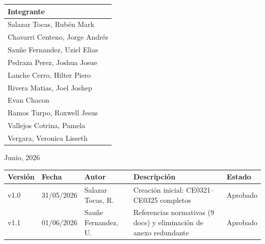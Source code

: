 \documentclass[11pt, a4paper, oneside]{report}
\begin{document}
\begin{titlepage}
  \begin{tabular}{@{}|l|@{}}
    \arrayrulecolor{upeu_dark}
    \rowcolor{upeu_dark}
    {\color{white}\bfseries\small Integrante} \\ \hline
    {\color{body_gray}\small Salazar Tocas, Rubén Mark} \\ \hline
    {\color{body_gray}\small Chavarri Centeno, Jorge Andrés} \\ \hline
    {\color{body_gray}\small Sauñe Fernandez, Uziel Elias} \\ \hline
    {\color{body_gray}\small Pedraza Perez, Joshua Josue} \\ \hline
    {\color{body_gray}\small Lanche Cerro, Hilter Piero} \\ \hline
    {\color{body_gray}\small Rivera Matias, Joel Joshep} \\ \hline
    {\color{body_gray}\small Evan Chacon} \\ \hline
    {\color{body_gray}\small Ramos Turpo, Roxwell Jesus} \\ \hline
    {\color{body_gray}\small Vallejos Cotrina, Pamela} \\ \hline
    {\color{body_gray}\small Vergara, Veronica Lisseth} \\ \hline
  \end{tabular}

  \vspace{0.6cm}
  {\color{body_gray} Junio, 2026}

  \vspace*{\fill}

\end{titlepage}

\newpage

\thispagestyle{empty}
\vspace{2cm}

{\centering

\begin{tabular}{@{}|C{1.5cm}|C{2.2cm}|L{3cm}|L{5cm}|C{2cm}|@{}}


  {\color{white}\bfseries\small Versión} &
  {\color{white}\bfseries\small Fecha} &
  {\color{white}\bfseries\small Autor} &
  {\color{white}\bfseries\small Descripción} &
  {\color{white}\bfseries\small Estado} \\  \hline

  \small v1.0 & \small 31/05/2026 & \small Salazar Tocas, R. & \small Creación inicial: CE0321--CE0325 completos & \small Aprobado \\ \hline
  \small v1.1 & \small 01/06/2026 & \small Sauñe Fernandez, U. & \small Referencias normativas (9 docs) y eliminación de anexo redundante & \small Aprobado \\ \hline

\end{tabular}
\par}
\end{document}
